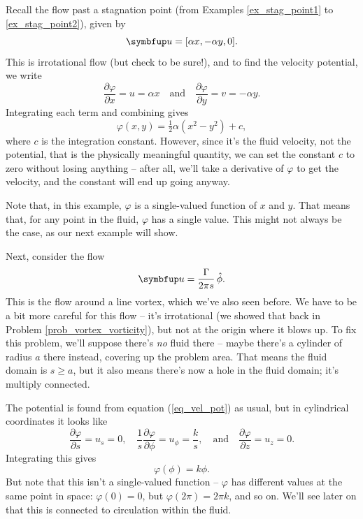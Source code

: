 \begin{example}
\label{ex_stag_pot}
Recall the flow past a stagnation point (from Examples \ref{ex_stag_point1} to \ref{ex_stag_point2}), given by
\[
\uu = [\alpha x, -\alpha y, 0].
\]
This is irrotational flow (but check to be sure!), and to find the velocity potential, we write
\[
\frac{\partial \varphi}{\partial x} = u = \alpha x \quad \text{and} \quad \frac{\partial \varphi}{\partial y} = v = -\alpha y.
\]
Integrating each term and combining gives
\[
\varphi(x, y) = \tfrac{1}{2} \alpha (x^2 - y^2) + c,
\]
where $c$ is the integration constant.  However, since it's the fluid velocity, not the potential, that is the physically meaningful quantity, we can set the constant $c$ to zero without losing anything -- after all, we'll take a derivative of $\varphi$ to get the velocity, and the constant will end up going anyway.

Note that, in this example, $\varphi$ is a single-valued function of $x$ and $y$.  That means that, for any point in the fluid, $\varphi$ has a single value.  This might not always be the case, as our next example will show.
\end{example}

\begin{example}
\label{ex_pot_vortex}
Next, consider the flow
\[
\uu = \frac{\Gamma}{2\pi s} \, \hat{\phi}.
\]
This is the flow around a line vortex, which we've also seen before.  We have to be a bit more careful for this flow -- it's irrotational (we showed that back in Problem \ref{prob_vortex_vorticity}), but not at the origin where it blows up.  To fix this problem, we'll suppose there's \emph{no} fluid there -- maybe there's a cylinder of radius $a$ there instead, covering up the problem area.  That means the fluid domain is $s \ge a$, but it also means there's now a hole in the fluid domain; it's multiply connected.

The potential is found from equation (\ref{eq_vel_pot}) as usual, but in cylindrical coordinates it looks like
\[
\frac{\partial \varphi}{\partial s} = u_s = 0, \quad \frac{1}{s} \frac{\partial \varphi}{\partial \phi} = u_\phi = \frac{k}{s}, \quad \text{and} \quad \frac{\partial \varphi}{\partial z} = u_z = 0.
\]
Integrating this gives
\begin{equation}
\varphi(\phi) = k \phi.
\end{equation}
But note that this isn't a single-valued function -- $\varphi$ has different values at the same point in space:  $\varphi(0) = 0$, but $\varphi(2\pi) = 2\pi k$, and so on.  We'll see later on that this is connected to circulation within the fluid.

\end{example}

